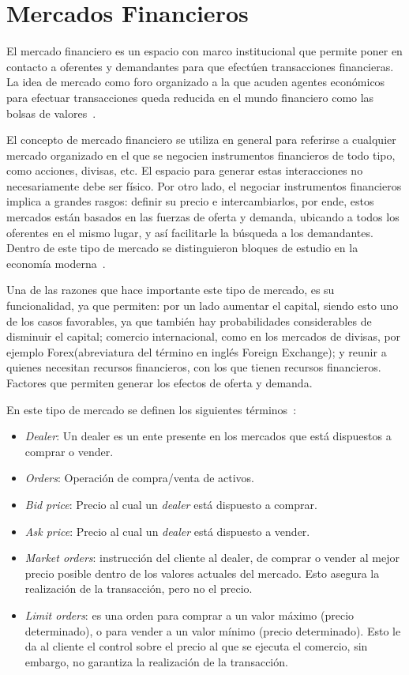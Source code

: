 \section{Mercados Financieros}

El mercado financiero es un espacio con marco institucional que permite poner
en contacto a oferentes y demandantes para que efectúen transacciones
financieras. La idea de mercado como foro organizado a la que acuden agentes
económicos para efectuar transacciones queda reducida en el mundo financiero
como las bolsas de valores~\cite{mishkin2006financial}.

El concepto de mercado financiero se utiliza en general para referirse a
cualquier mercado organizado en el que se negocien instrumentos financieros de
todo tipo, como acciones, divisas, etc. El espacio para generar estas
interacciones no necesariamente debe ser físico. Por otro lado, el negociar
instrumentos financieros implica a grandes rasgos: definir su precio e
intercambiarlos, por ende, estos mercados están basados en las fuerzas de
oferta y demanda, ubicando a todos los oferentes en el mismo lugar, y así
facilitarle la búsqueda a los demandantes. Dentro de este tipo de mercado se
distinguieron bloques de estudio en la economía moderna~\cite{jensen1984theory}.

Una de las razones que hace importante este tipo de mercado, es su
funcionalidad, ya que permiten: por un lado aumentar el capital, siendo esto
uno de los casos favorables, ya que también hay probabilidades considerables de
disminuir el capital; comercio internacional, como en los mercados de divisas,
por ejemplo Forex(abreviatura del término en inglés Foreign Exchange); y reunir
a quienes necesitan recursos financieros, con los que tienen recursos
financieros. Factores que permiten generar los efectos de oferta y demanda.

En este tipo de mercado se definen los siguientes términos~\cite{nevmyvaka2003electronic}:
\begin{itemize}
    \item \emph{Dealer}: Un dealer es un ente presente en los mercados que está
    dispuestos a comprar o vender.
    \item \emph{Orders}: Operación de compra/venta de activos.
    \item \emph{Bid price}: Precio al cual un \emph{dealer} está dispuesto a
    comprar.
    \item \emph{Ask price}: Precio al cual un \emph{dealer} está dispuesto a
    vender.
    \item \emph{Market orders}: instrucción del cliente al dealer, de comprar o
    vender al mejor precio posible dentro de los valores actuales del mercado.
    Esto asegura la realización de la transacción, pero no el precio.
    \item \emph{Limit orders}: es una orden para comprar a un valor máximo
    (precio determinado), o para vender a un valor mínimo (precio determinado).
    Esto le da al cliente el control sobre el precio al que se ejecuta el
    comercio, sin embargo, no garantiza la realización de la transacción.
\end{itemize}

